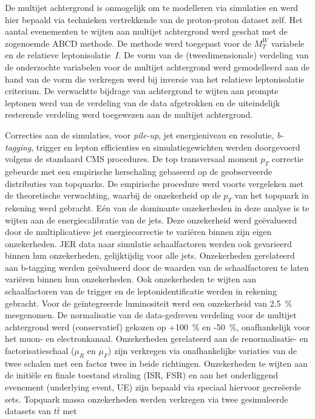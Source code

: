 De multijet achtergrond is onmogelijk om te modelleren via simulaties en werd
hier bepaald via technieken vertrekkende van de proton-proton dataset zelf. Het
aantal evenementen te wijten aan multijet achtergrond werd geschat 
met de zogenoemde ABCD methode. De methode werd toegepast voor de 
$M_{T}^W$ variabele en de relatieve leptonisolatie~$I$. De vorm van de
(tweedimensionale) verdeling van de onderzochte variabelen voor de multijet
achtergrond werd gemodelleerd aan de hand van de vorm die verkregen werd bij inversie
van het relatieve leptonisolatie criterium. De verwachtte bijdrage van achtergrond te wijten
aan prompte leptonen werd van de verdeling van de data afgetrokken en de
uiteindelijk resterende verdeling werd toegewezen aan de multijet achtergrond. 

Correcties aan de simulaties, voor {\it pile-up}, jet energieniveau
en resolutie, {\it b-tagging}, trigger en lepton efficienties en simulatiegewichten
werden doorgevoerd volgens de standaard CMS procedures. De top transversaal
moment $p_{T}$ correctie gebeurde met een empirische herschaling gebaseerd op de geobserveerde
distributies van topquarks. De empirische procedure werd voorts vergeleken met
de theoretische verwachting, waarbij de onzekerheid op de $p_T$ van het topquark 
in rekening werd gebracht. E\'en van de dominante onzekerheden in deze
analyse is te wijten aan de energiecalibratie van de jets. Deze onzekerheid
werd ge\"evalueerd door de 
multiplicatieve jet energiecorrectie te vari\"eren binnen zijn eigen
onzekerheden. JER data naar simulatie schaalfactoren werden ook gevarieerd
binnen hun onzekerheden, gelijktijdig voor alle jets. Onzekerheden gerelateerd
aan b-tagging werden ge\"evalueerd door de waarden van de schaalfactoren te
laten vari\"eren binnen hun onzekerheden. Ook onzekerheden te wijten aan
schaalfactoren van de trigger en de leptonidentificatie werden in rekening
gebracht. Voor de ge\"integreerde luminositeit werd een onzekerheid van
2.5~\% meegenomen.  
De normalisatie van de data-gedreven verdeling voor de multijet achtergrond werd
(conservatief) gekozen op +100~\% en -50~\%, onafhankelijk voor het muon- en
electronkanaal. Onzekerheden gerelateerd aan 
de renormalisatie- en factorisatieschaal ($\mu_{R}$ en $\mu_{F}$)
zijn verkregen via onafhankelijke variaties van de twee schalen met
een factor twee in beide richtingen. Onzekerheden te wijten aan de initi\"ele
en finale toestand straling (ISR, FSR) en aan het onderliggend evenement (underlying
event, UE) zijn bepaald via speciaal hiervoor gecre\"eerde sets. Topquark
massa onzekerheden werden verkregen via twee gesimuleerde datasets van $t\bar t$ met
